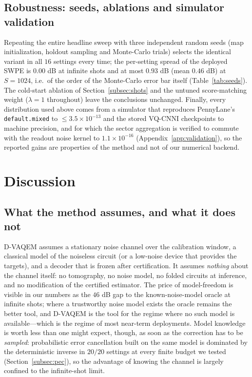\documentclass[ASNA,twocolumn]{USG}
\newcommand{\dvaqem}{D-VAQEM}
\begin{document}
\subsection{Robustness: seeds, ablations and simulator validation}
\label{subsec:robust}

Repeating the entire headline sweep with three independent random seeds (map
initialization, holdout sampling and Monte-Carlo trials) selects the identical
variant in all $16$ settings every time; the per-setting spread of the deployed
SWPE is $0.00$ dB at infinite shots and at most $0.93$ dB (mean $0.46$ dB) at
$S=1024$, i.e.\ of the order of the Monte-Carlo error bar itself
(Table~\ref{tab:seeds}).  The cold-start ablation of
Section~\ref{subsec:shots} and the untuned score-matching weight ($\lambda=1$
throughout) leave the conclusions unchanged.  Finally, every distribution used
above comes from a simulator that reproduces PennyLane's \texttt{default.mixed}
to $\le3.5\times10^{-13}$ and the stored VQ-CNNI checkpoints to machine
precision, and for which the sector aggregation is verified to commute with the
readout noise kernel to $1.1\times10^{-16}$ (Appendix~\ref{app:validation}), so
the reported gains are properties of the method and not of our numerical
backend.

\section{Discussion}
\label{sec:discussion}

\subsection{What the method assumes, and what it does not}
\dvaqem{} assumes a stationary noise channel over the calibration window, a
classical model of the noiseless circuit (or a low-noise device that provides
the targets), and a decoder that is frozen after certification.  It assumes
\emph{nothing} about the channel itself: no tomography, no noise model, no
folded circuits at inference, and no modification of the certified estimator.
The price of model-freedom is visible in our numbers as the $46$ dB gap to the
known-noise-model oracle at infinite shots; where a trustworthy noise model
exists the oracle remains the better tool, and \dvaqem{} is the tool for the
regime where no such model is available---which is the regime of most near-term
deployments.  Model knowledge is worth less than one might expect, though, as
soon as the correction has to be \emph{sampled}: probabilistic error
cancellation built on the same model is dominated by the deterministic inverse
in $20/20$ settings at every finite budget we tested
(Section~\ref{subsec:pec}), so the advantage of knowing the channel is largely
confined to the infinite-shot limit.
\end{document}

